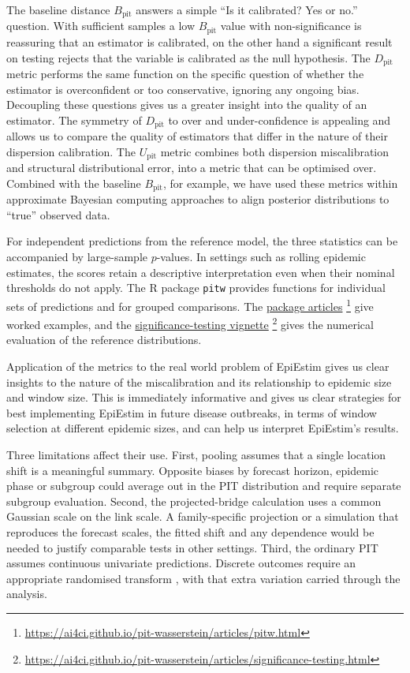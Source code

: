 \documentclass[twoside,11pt,hyphens]{article}
\newcommand{\Bpit}{B_{\mathrm{pit}}}
\newcommand{\Dpit}{D_{\mathrm{pit}}}
\newcommand{\Upit}{U_{\mathrm{pit}}}
\newcommand{\pkgdownurl}{https://ai4ci.github.io/pit-wasserstein}
\newcommand{\vignette}[2]{%
  \href{\pkgdownurl/articles/#1.html}{#2}%
  \footnote{\url{\pkgdownurl/articles/#1.html}}%
}
\begin{document}
The baseline distance $\Bpit$ answers a simple ``Is it calibrated? Yes or no.'' question. With sufficient samples a low $\Bpit$ value with non-significance is reassuring that an estimator is calibrated, on the other hand a significant result on testing rejects that the variable is calibrated as the null hypothesis. The $\Dpit$ metric performs the same function on the specific question of whether the estimator is overconfident or too conservative, ignoring any ongoing bias. Decoupling these questions gives us a greater insight into the quality of an estimator. The symmetry of $\Dpit$ to over and under-confidence is appealing and allows us to compare the quality of estimators that differ in the nature of their dispersion calibration. The $\Upit$ metric combines both dispersion miscalibration and structural distributional error, into a metric that can be optimised over. Combined with the baseline $\Bpit$, for example, we have used these metrics within approximate Bayesian computing approaches to align posterior distributions to ``true'' observed data.

For independent predictions from the reference model, the three statistics can be accompanied by large-sample $p$-values. In settings such as rolling epidemic estimates, the scores retain a descriptive interpretation even when their nominal thresholds do not apply. The R package \texttt{pitw} provides functions for individual sets of predictions and for grouped comparisons. The \vignette{pitw}{package articles} give worked examples, and the \vignette{significance-testing}{significance-testing vignette} gives the numerical evaluation of the reference distributions.

Application of the metrics to the real world problem of EpiEstim gives us clear insights to the nature of the miscalibration and its relationship to epidemic size and window size. This is immediately informative and gives us clear strategies for best implementing EpiEstim in future disease outbreaks, in terms of window selection at different epidemic sizes, and can help us interpret EpiEstim's results.

Three limitations affect their use. First, pooling assumes that a single location shift is a meaningful summary. Opposite biases by forecast horizon, epidemic phase or subgroup could average out in the PIT distribution and require separate subgroup evaluation. Second, the projected-bridge calculation uses a common Gaussian scale on the link scale. A family-specific projection or a simulation that reproduces the forecast scales, the fitted shift and any dependence would be needed to justify comparable tests in other settings. Third, the ordinary PIT assumes continuous univariate predictions. Discrete outcomes require an appropriate randomised transform \citep{brockwell2007}, with that extra variation carried through the analysis.
\end{document}
